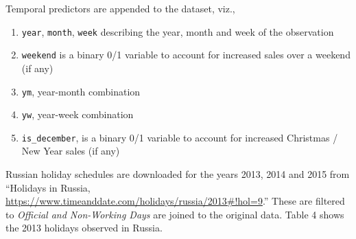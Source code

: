 \documentclass[floatsintext,man]{apa6}
\providecommand{\tightlist}{%
  \setlength{\itemsep}{0pt}\setlength{\parskip}{0pt}}
\theoremstyle{definition}
\theoremstyle{definition}
\theoremstyle{definition}
\theoremstyle{remark}
\begin{document}
Temporal predictors are appended to the dataset, viz.,

\begin{enumerate}
\def\labelenumi{\arabic{enumi}.}
\tightlist
\item
  \texttt{year}, \texttt{month}, \texttt{week} describing the year,
  month and week of the observation
\item
  \texttt{weekend} is a binary 0/1 variable to account for increased
  sales over a weekend (if any)
\item
  \texttt{ym}, year-month combination
\item
  \texttt{yw}, year-week combination
\item
  \texttt{is\_december}, is a binary 0/1 variable to account for
  increased Christmas / New Year sales (if any)
\end{enumerate}

Russian holiday schedules are downloaded for the years 2013, 2014 and
2015 from \enquote{Holidays in Russia,
\url{https://www.timeanddate.com/holidays/russia/2013\#!hol=9}.} These
are filtered to \emph{Official and Non-Working Days} are joined to the
original data. Table 4 shows the 2013 holidays observed in Russia.
\end{document}
